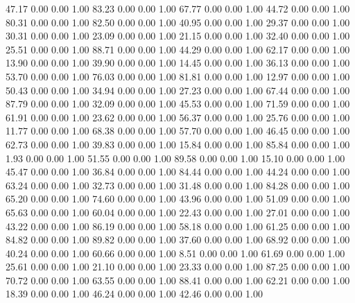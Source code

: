    47.17   0.00   0.00   1.00
   83.23   0.00   0.00   1.00
   67.77   0.00   0.00   1.00
   44.72   0.00   0.00   1.00
   80.31   0.00   0.00   1.00
   82.50   0.00   0.00   1.00
   40.95   0.00   0.00   1.00
   29.37   0.00   0.00   1.00
   30.31   0.00   0.00   1.00
   23.09   0.00   0.00   1.00
   21.15   0.00   0.00   1.00
   32.40   0.00   0.00   1.00
   25.51   0.00   0.00   1.00
   88.71   0.00   0.00   1.00
   44.29   0.00   0.00   1.00
   62.17   0.00   0.00   1.00
   13.90   0.00   0.00   1.00
   39.90   0.00   0.00   1.00
   14.45   0.00   0.00   1.00
   36.13   0.00   0.00   1.00
   53.70   0.00   0.00   1.00
   76.03   0.00   0.00   1.00
   81.81   0.00   0.00   1.00
   12.97   0.00   0.00   1.00
   50.43   0.00   0.00   1.00
   34.94   0.00   0.00   1.00
   27.23   0.00   0.00   1.00
   67.44   0.00   0.00   1.00
   87.79   0.00   0.00   1.00
   32.09   0.00   0.00   1.00
   45.53   0.00   0.00   1.00
   71.59   0.00   0.00   1.00
   61.91   0.00   0.00   1.00
   23.62   0.00   0.00   1.00
   56.37   0.00   0.00   1.00
   25.76   0.00   0.00   1.00
   11.77   0.00   0.00   1.00
   68.38   0.00   0.00   1.00
   57.70   0.00   0.00   1.00
   46.45   0.00   0.00   1.00
   62.73   0.00   0.00   1.00
   39.83   0.00   0.00   1.00
   15.84   0.00   0.00   1.00
   85.84   0.00   0.00   1.00
    1.93   0.00   0.00   1.00
   51.55   0.00   0.00   1.00
   89.58   0.00   0.00   1.00
   15.10   0.00   0.00   1.00
   45.47   0.00   0.00   1.00
   36.84   0.00   0.00   1.00
   84.44   0.00   0.00   1.00
   44.24   0.00   0.00   1.00
   63.24   0.00   0.00   1.00
   32.73   0.00   0.00   1.00
   31.48   0.00   0.00   1.00
   84.28   0.00   0.00   1.00
   65.20   0.00   0.00   1.00
   74.60   0.00   0.00   1.00
   43.96   0.00   0.00   1.00
   51.09   0.00   0.00   1.00
   65.63   0.00   0.00   1.00
   60.04   0.00   0.00   1.00
   22.43   0.00   0.00   1.00
   27.01   0.00   0.00   1.00
   43.22   0.00   0.00   1.00
   86.19   0.00   0.00   1.00
   58.18   0.00   0.00   1.00
   61.25   0.00   0.00   1.00
   84.82   0.00   0.00   1.00
   89.82   0.00   0.00   1.00
   37.60   0.00   0.00   1.00
   68.92   0.00   0.00   1.00
   40.24   0.00   0.00   1.00
   60.66   0.00   0.00   1.00
    8.51   0.00   0.00   1.00
   61.69   0.00   0.00   1.00
   25.61   0.00   0.00   1.00
   21.10   0.00   0.00   1.00
   23.33   0.00   0.00   1.00
   87.25   0.00   0.00   1.00
   70.72   0.00   0.00   1.00
   63.55   0.00   0.00   1.00
   88.41   0.00   0.00   1.00
   62.21   0.00   0.00   1.00
   18.39   0.00   0.00   1.00
   46.24   0.00   0.00   1.00
   42.46   0.00   0.00   1.00
